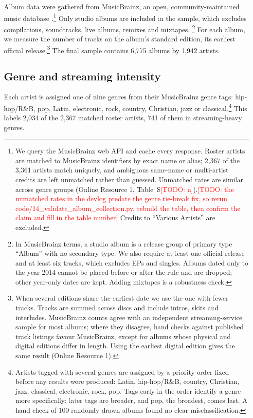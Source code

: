 \documentclass[pdflatex,sn-apa]{sn-jnl}
\newcommand{\todo}[1]{\textcolor{red}{[TODO: #1]}}
\begin{document}
Album data were gathered from MusicBrainz, an open, community-maintained music database \citep{swartz2002musicbrainz,musicbrainz}.\footnote{We query the MusicBrainz web API and cache every response. Roster artists are matched to MusicBrainz identifiers by exact name or alias; 2,367 of the 3,361 artists match uniquely, and ambiguous same-name or multi-artist credits are left unmatched rather than guessed. Unmatched rates are similar across genre groups (Online Resource 1, Table~S\todo{n}).\todo{the unmatched rates in the devlog predate the genre tie-break fix, so rerun code/14\_validate\_album\_collection.py, rebuild the table, then confirm the claim and fill in the table number} Credits to ``Various Artists'' are excluded.} Only studio albums are included in the sample, which excludes compilations, soundtracks, live albums, remixes and mixtapes. \footnote{In MusicBrainz terms, a studio album is a release group of primary type ``Album'' with no secondary type. We also require at least one official release and at least six tracks, which excludes EPs and singles. Albums dated only to the year 2014 cannot be placed before or after the rule and are dropped; other year-only dates are kept. Adding mixtapes is a robustness check.} For each album, we measure the number of tracks on the album's standard edition, its earliest official release.\footnote{When several editions share the earliest date we use the one with fewer tracks. Tracks are summed across discs and include intros, skits and interludes. MusicBrainz counts agree with an independent streaming-service sample for most albums; where they disagree, hand checks against published track listings favour MusicBrainz, except for albums whose physical and digital editions differ in length. Using the earliest digital edition gives the same result (Online Resource 1).} The final sample contains 6,775 albums by 1,942 artists.

\subsection{Genre and streaming intensity}\label{subsec:genre}
Each artist is assigned one of nine genres from their MusicBrainz genre tags: hip-hop/R\&B, pop, Latin, electronic, rock, country, Christian, jazz or classical.\footnote{Artists tagged with several genres are assigned by a priority order fixed before any results were produced: Latin, hip-hop/R\&B, country, Christian, jazz, classical, electronic, rock, pop. Tags early in the order identify a genre more specifically; later tags are broader, and pop, the broadest, comes last. A hand check of 100 randomly drawn albums found no clear misclassification.} This labels 2,034 of the 2,367 matched roster artists, 741 of them in streaming-heavy genres.
\end{document}
